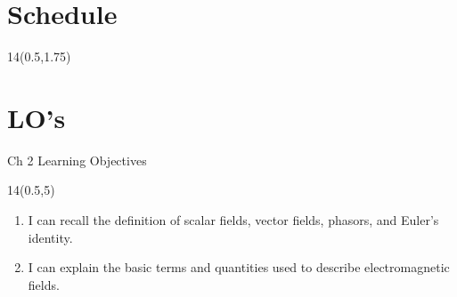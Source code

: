 \def\lessonNum{2}

\section{Schedule}
\renewcommand{\arraystretch}{1}
\begin{frame}{}
	\begin{textblock}{14}(0.5,1.75)
	\def\myfontsize{footnotesize}
	
	\end{textblock}
\end{frame}

\section{LO's}

\begin{frame}{Ch 2 Learning Objectives}
	\begin{textblock}{14}(0.5,5)
	\begin{myblock}[0.9]{}
		\begin{enumerate}[{2}.1]
			\setlength{\itemsep}{18pt}
			\item \alert{I can recall the definition of scalar fields, vector fields, phasors, and Euler's identity.}
			\item \alert{I can explain the basic terms and quantities used to describe electromagnetic fields.}
		\end{enumerate}
	\end{myblock}
	\end{textblock}
\end{frame}



